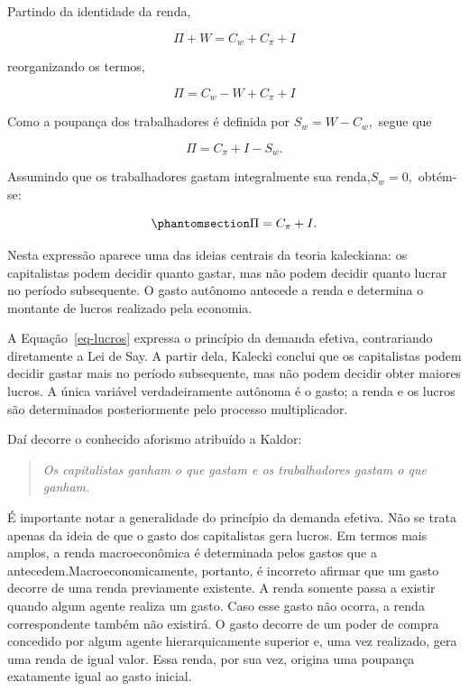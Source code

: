 \documentclass[
  brazilian,
  letterpaper,
  DIV=11,
  numbers=noendperiod]{scrreprt}
\begin{document}
Partindo da identidade da renda,

\[\Pi + W = C_w + C_{\pi} + I\]

reorganizando os termos,

\[\Pi = C_w - W + C_{\pi} + I\]

Como a poupança dos trabalhadores é definida por \(S_w = W - C_w,\)
segue que

\[\Pi = C_{\pi} + I - S_w.\]

Assumindo que os trabalhadores gastam integralmente sua
renda,\(S_w = 0,\) obtém-se:

\begin{equation}\protect\phantomsection\label{eq-lucros}{\Pi = C_{\pi} + I.}\end{equation}

\begin{tcolorbox}[enhanced jigsaw, arc=.35mm, bottomrule=.15mm, bottomtitle=1mm, breakable, colback=white, colbacktitle=quarto-callout-note-color!10!white, colframe=quarto-callout-note-color-frame, coltitle=black, left=2mm, leftrule=.75mm, opacityback=0, opacitybacktitle=0.6, rightrule=.15mm, title=\textcolor{quarto-callout-note-color}{\faInfo}\hspace{0.5em}{Princípio da demanda efetiva}, titlerule=0mm, toprule=.15mm, toptitle=1mm]

Nesta expressão aparece uma das ideias centrais da teoria kaleckiana: os
capitalistas podem decidir quanto gastar, mas não podem decidir quanto
lucrar no período subsequente. O gasto autônomo antecede a renda e
determina o montante de lucros realizado pela economia.

\end{tcolorbox}

A Equação~\ref{eq-lucros} expressa o princípio da demanda efetiva,
contrariando diretamente a Lei de Say. A partir dela, Kalecki conclui
que os capitalistas podem decidir gastar mais no período subsequente,
mas não podem decidir obter maiores lucros. A única variável
verdadeiramente autônoma é o gasto; a renda e os lucros são determinados
posteriormente pelo processo multiplicador.

Daí decorre o conhecido aforismo atribuído a Kaldor:

\begin{quote}
\emph{Os capitalistas ganham o que gastam e os trabalhadores gastam o
que ganham.}
\end{quote}

É importante notar a generalidade do princípio da demanda efetiva. Não
se trata apenas da ideia de que o gasto dos capitalistas gera lucros. Em
termos mais amplos, a renda macroeconômica é determinada pelos gastos
que a antecedem.Macroeconomicamente, portanto, é incorreto afirmar que
um gasto decorre de uma renda previamente existente. A renda somente
passa a existir quando algum agente realiza um gasto. Caso esse gasto
não ocorra, a renda correspondente também não existirá. O gasto decorre
de um poder de compra concedido por algum agente hierarquicamente
superior e, uma vez realizado, gera uma renda de igual valor. Essa
renda, por sua vez, origina uma poupança exatamente igual ao gasto
inicial.
\end{document}
